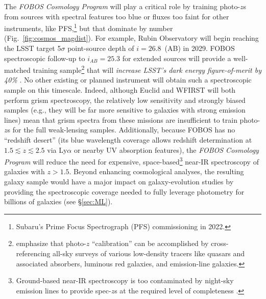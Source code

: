 \documentclass[11pt,a4paper,twoside,onecolumn,openany,final,oldfontcommands]{memoir}
\begin{document}
The {\it FOBOS Cosmology Program} will play a critical role by training photo-$z$s from sources with spectral features too blue or fluxes too faint for other instruments, like PFS,\footnote{Subaru's Prime Focus Spectrograph (PFS) commissioning in 2022.} but that dominate by number (Fig.~\ref{fig:cosmos_magdist}).  For example, Rubin Observatory will begin reaching the LSST target 5$\sigma$ point-source depth of $i = 26.8$~(AB) in 2029.   FOBOS spectroscopic follow-up to $i_{AB} = 25.3$ for extended sources will provide a well-matched training sample\footnote{\citet{newman15} emphasize that photo-$z$ ``calibration'' can be accomplished by cross-referencing all-sky surveys of various low-density tracers like quasars and associated absorbers, luminous red galaxies, and emission-line galaxies.} that will \emph{increase LSST's dark energy figure-of-merit by 40\%} \citep{newman15}. No other existing or planned instrument will obtain such a spectroscopic sample on this timescale.  Indeed, although Euclid and WFIRST will both perform grism spectroscopy, the relatively low sensitivity and strongly biased samples (e.g., they will be far more sensitive to galaxies with strong emission lines) mean that grism spectra from these missions are insufficient to train photo-$z$s for the full weak-lensing samples.  Additionally, because FOBOS has no ``redshift desert'' (its blue wavelength coverage allows redshift determination at $1.5\lesssim z \lesssim2.5$ via Ly$\alpha$ or nearby UV absorption features), the {\it FOBOS Cosmology Program} will reduce the need for expensive, space-based\footnote{Ground-based near-IR spectroscopy is too contaminated by night-sky emission lines to provide spec-$z$s at the required level of completeness \citep{newman15}.} near-IR spectroscopy of galaxies with $z > 1.5$.  Beyond enhancing cosmological analyses, the resulting galaxy sample would have a major impact on galaxy-evolution studies by providing the spectroscopic coverage needed to fully leverage photometry for billions of galaxies (see \S\ref{sec:ML}). 

\end{document}
